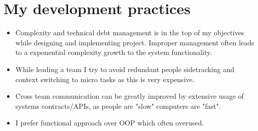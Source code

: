 \documentclass[letterpaper,11pt]{article}
\begin{document}
\section{My development practices}


\begin{itemize}
 \item Complexity and technical debt management is in the top of my objectives while designing and implementing project. Improper management often leads to a exponential complexity growth to the system functionality.
 \item While leading a team I try to avoid redundant people sidetracking and context switching to micro tasks as this is very expensive.
 \item Cross team communication can be greatly improved by extensive usage of systems contracts/APIs, as people are "slow" computers are "fast".
 \item I prefer functional approach over OOP which often overused.
\end{itemize}

\end{document}
